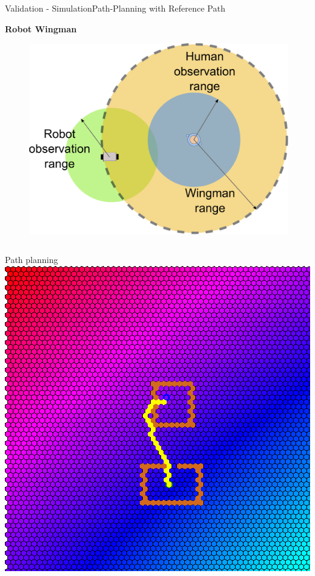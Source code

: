\begin{frame}{Validation - Simulation}{Path-Planning with Reference Path}

{\bf Robot Wingman}

\begin{figure}
\centering
\includegraphics[width = .35\textwidth]{./figure/Wingman}
\end{figure}

\begin{columns}

\begin{minipage}{\textwidth}
\begin{block}{Path planning}
\centering
\includegraphics[width = \textwidth]{./figure/simulation/hexamap.png}
\end{block}
\end{minipage}



\end{columns}
\end{frame}
